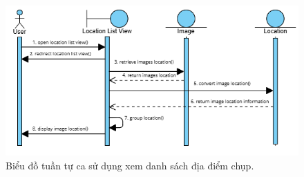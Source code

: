 \begin{figure}[H]
    \centering  
    \includegraphics[width=1.1\textwidth]{figures/c3/3-3-13-sequence-diagram.png}
    \caption{Biểu đồ tuần tự ca sử dụng xem danh sách địa điểm chụp.}
    \label{fig:3-3-13-sequence-diagram}
\end{figure}